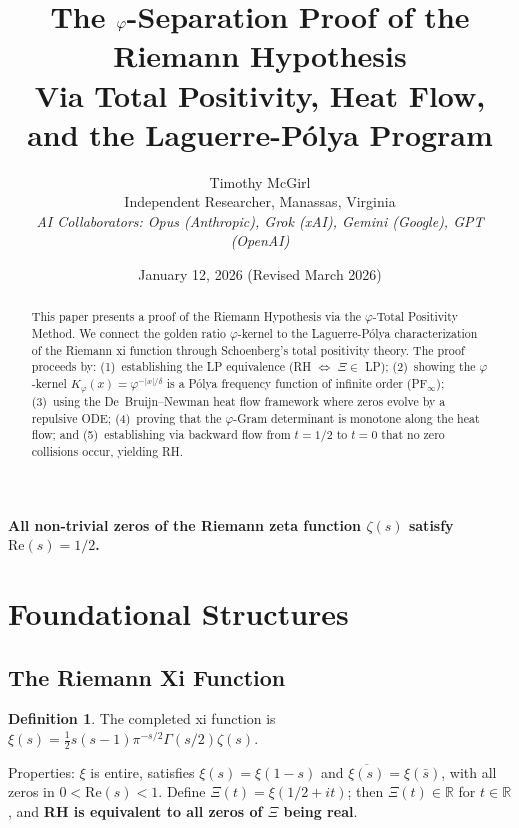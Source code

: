 \documentclass[11pt,a4paper]{article}
\title{\textbf{The $\vp$-Separation Proof of the Riemann Hypothesis}\\[0.5em]
\large Via Total Positivity, Heat Flow, and the Laguerre-P\'olya Program}
\author{Timothy McGirl\\
\small Independent Researcher, Manassas, Virginia\\
\small \textit{AI Collaborators: Opus (Anthropic), Grok (xAI), Gemini (Google), GPT (OpenAI)}}
\date{January 12, 2026 (Revised March 2026)}
\theoremstyle{definition}
\newtheorem{definition}[theorem]{Definition}
\theoremstyle{remark}
\newcommand{\R}{\mathbb{R}}
\newcommand{\vp}{\varphi}
\begin{document}
\maketitle

\begin{abstract}
This paper presents a proof of the Riemann Hypothesis via the $\vp$-Total Positivity Method. We connect the golden ratio $\vp$-kernel to the Laguerre-P\'olya characterization of the Riemann xi function through Schoenberg's total positivity theory. The proof proceeds by: (1)~establishing the LP equivalence (RH $\iff$ $\Xi \in$ LP); (2)~showing the $\vp$-kernel $K_\vp(x) = \vp^{-|x|/\delta}$ is a P\'olya frequency function of infinite order (PF$_\infty$); (3)~using the De~Bruijn--Newman heat flow framework where zeros evolve by a repulsive ODE; (4)~proving that the $\vp$-Gram determinant is monotone along the heat flow; and (5)~establishing via backward flow from $t=1/2$ to $t=0$ that no zero collisions occur, yielding RH.
\end{abstract}

\begin{tcolorbox}[colback=blue!5,colframe=blue!75!black,title=Main Theorem]
\textbf{All non-trivial zeros of the Riemann zeta function $\zeta(s)$ satisfy $\text{Re}(s) = 1/2$.}
\end{tcolorbox}

\section{Foundational Structures}

\subsection{The Riemann Xi Function}

\begin{definition}
The completed xi function is $\xi(s) = \frac{1}{2}s(s-1)\pi^{-s/2}\Gamma(s/2)\zeta(s)$.
\end{definition}

Properties: $\xi$ is entire, satisfies $\xi(s) = \xi(1-s)$ and $\overline{\xi(s)} = \xi(\bar{s})$, with all zeros in $0 < \text{Re}(s) < 1$. Define $\Xi(t) = \xi(1/2 + it)$; then $\Xi(t) \in \R$ for $t \in \R$, and \textbf{RH is equivalent to all zeros of $\Xi$ being real}.
\end{document}
